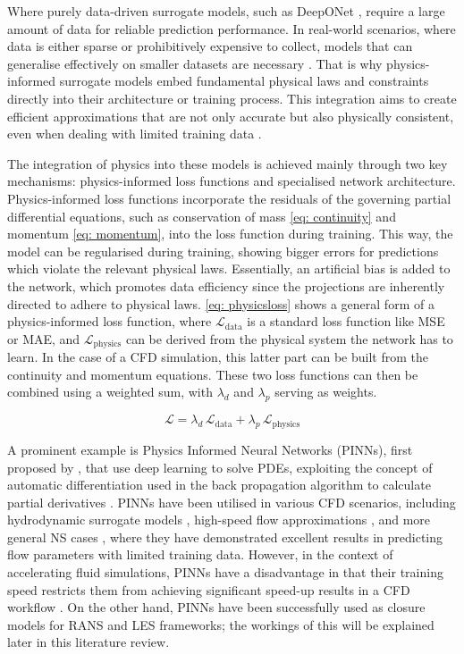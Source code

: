 Where purely data-driven surrogate models, such as DeepONet \cite{Lu2021}, require a large amount of data for reliable prediction performance. In real-world scenarios, where data is either sparse or prohibitively expensive to collect, models that can generalise effectively on smaller datasets are necessary \cite{Donnelly2024}. That is why physics-informed surrogate models embed fundamental physical laws and constraints directly into their architecture or training process. This integration aims to create efficient approximations that are not only accurate but also physically consistent, even when dealing with limited training data \cite{Raissi2019}. 

The integration of physics into these models is achieved mainly through two key mechanisms: physics-informed loss functions and specialised network architecture. Physics-informed loss functions incorporate the residuals of the governing partial differential equations, such as conservation of mass \ref{eq: continuity} and momentum \ref{eq: momentum}, into the loss function during training. This way, the model can be regularised during training, showing bigger errors for predictions which violate the relevant physical laws. Essentially, an artificial bias is added to the network, which promotes data efficiency since the projections are inherently directed to adhere to physical laws. \autoref{eq: physicsloss} shows a general form of a physics-informed loss function, where $\mathcal{L}_{\text{data}}$ is a standard loss function like MSE or MAE, and $\mathcal{L}_{\text{physics}}$ can be derived from the physical system the network has to learn. In the case of a CFD simulation, this latter part can be built from the continuity and momentum equations. These two loss functions can then be combined using a weighted sum, with $\lambda_d$ and $\lambda_p$ serving as weights.

\begin{equation}\label{eq: physicsloss}
\mathcal{L} = \lambda_d \, \mathcal{L}_{\text{data}} 
+ \lambda_p \, \mathcal{L}_{\text{physics}} 
\end{equation}

A prominent example is Physics Informed Neural Networks (PINNs), first proposed by \textcite{Raissi2019}, that use deep learning to solve PDEs, exploiting the concept of automatic differentiation used in the back propagation algorithm to calculate partial derivatives \cite{Vinuesa2022}. PINNs have been utilised in various CFD scenarios, including hydrodynamic surrogate models \cite{Donnelly2024}, high-speed flow approximations \cite{Mao2020}, and more general NS cases \cite{Eivazi2021, Sun2019}, where they have demonstrated excellent results in predicting flow parameters with limited training data. However, in the context of accelerating fluid simulations, PINNs have a disadvantage in that their training speed restricts them from achieving significant speed-up results in a CFD workflow \cite{Jeon2024, Go2023}. On the other hand, PINNs have been successfully used as closure models for RANS and LES frameworks; the workings of this will be explained later in this literature review. 

